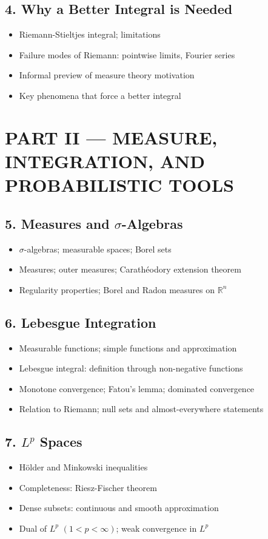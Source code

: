 \subsection{4. Why a Better Integral is Needed}
\begin{itemize}
\item Riemann-Stieltjes integral; limitations
\item Failure modes of Riemann: pointwise limits, Fourier series
\item Informal preview of measure theory motivation
\item Key phenomena that force a better integral
\end{itemize}

\section{PART II --- MEASURE, INTEGRATION, AND PROBABILISTIC TOOLS}

\subsection{5. Measures and $\sigma$-Algebras}
\begin{itemize}
\item $\sigma$-algebras; measurable spaces; Borel sets
\item Measures; outer measures; Carath\'eodory extension theorem
\item Regularity properties; Borel and Radon measures on $\mathbb{R}^n$
\end{itemize}

\subsection{6. Lebesgue Integration}
\begin{itemize}
\item Measurable functions; simple functions and approximation
\item Lebesgue integral: definition through non-negative functions
\item Monotone convergence; Fatou's lemma; dominated convergence
\item Relation to Riemann; null sets and almost-everywhere statements
\end{itemize}

\subsection{7. $L^p$ Spaces}
\begin{itemize}
\item H\"older and Minkowski inequalities
\item Completeness: Riesz-Fischer theorem
\item Dense subsets: continuous and smooth approximation
\item Dual of $L^p$ $(1 < p < \infty)$; weak convergence in $L^p$
\end{itemize}

